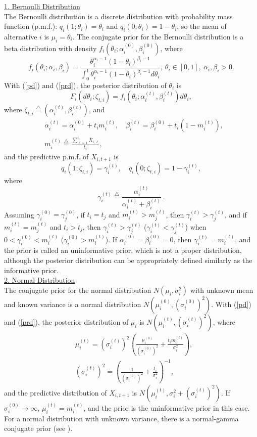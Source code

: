 \documentclass[journal]{IEEEtran}
\newcommand{\ed}{\stackrel{\triangle}{=}}
\begin{document}
\noindent \underline{1. Bernoulli Distribution}\\

The Bernoulli distribution is a discrete distribution with probability mass function (p.m.f.): $q_i(1;\theta_i)=\theta_i$ and $q_i(0;\theta_i)=1-\theta_i$, so the mean of alternative $i$ is $\mu_i=\theta_i$. The conjugate prior for the Bernoulli distribution is a beta distribution with density $f_i(\theta_i;\alpha_i^{(0)},\beta_i^{(0)})$, where 
$$f_i(\theta_i;\alpha_i,\beta_i)=\frac{\theta_i^{\alpha_i-1}\left(1-\theta_i\right)^{\beta_i-1}}{\int_{0}^{1}\theta_i^{\alpha_i-1}\left(1-\theta_i\right)^{\beta_i-1}d\theta_i},~\theta_i\in[0,1],~\alpha_i,\beta_i>0.$$
With (\ref{pd}) and (\ref{prd}),  the posterior distribution of $\theta_i$ is
$$F_i(d\theta_i;\zeta_{t,i})=f_i(\theta_i;\alpha_i^{(t)},\beta_i^{(t)}) d\theta_i,$$
where $\zeta_{t,i}\ed(\alpha_i^{(t)},\beta_i^{(t)})$, and 
\begin{align*}
&\alpha_i^{(t)}=\alpha_i^{(0)}+t_i m_i^{(t)},\quad 
\beta_i^{(t)}=\beta_i^{(0)}+t_i(1-m_i^{(t)}),\\& m_i^{(t)}\ed\frac{\sum_{\ell=1}^{t_i}  \bar{X}_{i,\ell}}{t_i},\end{align*}
and the predictive p.m.f. of $X_{i,t+1}$ is
$$q_i(1;\zeta_{t,i})=\gamma_i^{(t)},\quad q_i(0;\zeta_{t,i})=1-\gamma_i^{(t)},$$
where 
$$\gamma_i^{(t)}\ed\frac{\alpha_i^{(t)}}{\alpha_i^{(t)}+\beta_i^{(t)}}~.$$
Assuming $\gamma_i^{(0)}=\gamma_j^{(0)}$, if $t_i=t_j$ and $m_i^{(t)}>m_j^{(t)}$, then $\gamma_i^{(t)}>\gamma_j^{(t)}$, and if
    $m_i^{(t)}=m_j^{(t)}$ and $t_i>t_j$, then $\gamma_i^{(t)}>\gamma_j^{(t)}$ ($\gamma_i^{(t)}<\gamma_j^{(t)}$) when $0<\gamma_i^{(0)}<m_i^{(t)}$ ($\gamma_i^{(0)}>m_i^{(t)}$).
If $\alpha_i^{(0)}=\beta_i^{(0)}=0$, then
$\gamma_i^{(t)}=m_i^{(t)}$, and 
 the prior is called an uninformative prior, which is not a proper distribution, although the posterior distribution can be appropriately defined similarly as the informative prior.  
  \\



\noindent \underline{2. Normal Distribution}\\

The conjugate prior for the normal distribution $N(\mu_i,\sigma_i^2)$ with unknown mean and known variance  is a normal distribution $N(\mu_i^{(0)},(\sigma_i^{(0)})^2)$. With (\ref{pd}) and (\ref{prd}), the posterior distribution of $\mu_i$ is $N(\mu_i^{(t)},(\sigma_i^{(t)})^2)$,
where 
\begin{align*}&\mu_i^{(t)}=(\sigma_i^{(t)})^2\left(\frac{\mu_i^{(0)}}{(\sigma_i^{(0)})^2}+\frac{t_i m_i^{(t)}}{\sigma_i^2}\right),\\
 &(\sigma_i^{(t)})^2=\left(\frac{1}{(\sigma_i^{(0)})^2}+\frac{t_i}{\sigma_i^2}\right)^{-1},\end{align*}
and the predictive distribution of $X_{i,t+1}$ is $N(\mu_i^{(t)},\sigma_i^2+(\sigma_i^{(t)})^2)$. If $\sigma_i^{(0)}\to\infty$, $\mu_i^{(t)}=m_i^{(t)}$, and the prior is the uninformative prior in this case. For a normal distribution with unknown variance, there is a normal-gamma conjugate prior (see \cite{degroot2005optimal}). \vspace*{2mm}
\end{document}
